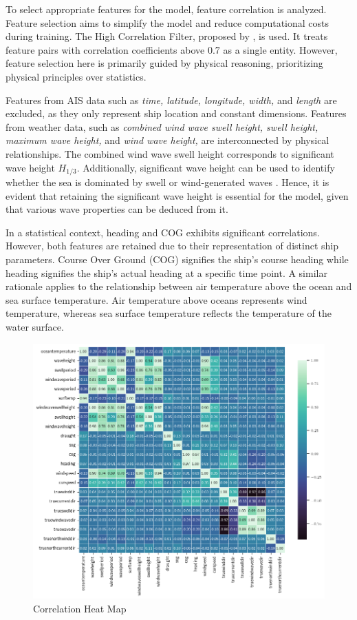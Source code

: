 \documentclass[]{interact}
\theoremstyle{plain}%
\theoremstyle{definition}
\theoremstyle{remark}
\begin{document}
To select appropriate features for the model, feature correlation is analyzed. Feature selection aims to simplify the model and reduce computational costs during training. The High Correlation Filter, proposed by \citet{Abebe.2020}, is used. It treats feature pairs with correlation coefficients above 0.7 as a single entity. However, feature selection here is primarily guided by physical reasoning, prioritizing physical principles over statistics.

Features from AIS data such as \emph{time, latitude, longitude, width,} and \emph{length} are excluded, as they only represent ship location and constant dimensions. Features from weather data, such as \emph{combined wind wave swell height, swell height, maximum wave height,} and \emph{wind wave height,} are interconnected by physical relationships. The combined wind wave swell height corresponds to significant wave height $H_{1/3}$. Additionally, significant wave height can be used to identify whether the sea is dominated by swell or wind-generated waves \citep{BitnerGregersen.2005}. Hence, it is evident that retaining the significant wave height is essential for the model, given that various wave properties can be deduced from it. 

In a statistical context, heading and COG exhibits significant correlations. However, both features are retained due to their representation of distinct ship parameters. Course Over Ground (COG) signifies the ship's course heading while heading signifies the ship's actual heading at a specific time point. A similar rationale applies to the relationship between air temperature above the ocean and sea surface temperature. Air temperature above oceans represents wind temperature, whereas sea surface temperature reflects the temperature of the water surface.

\begin{figure}[h!]
  \centering
  \includegraphics[width=.8\linewidth,height=.8\textheight,keepaspectratio]{00_figures/heatmap_corr_ovr.png}
  \caption{Correlation Heat Map}
  \label{fig:heatmap_ovr}
\end{figure}
\end{document}
